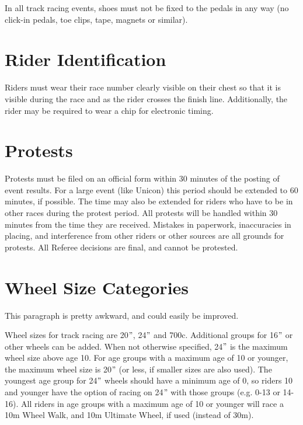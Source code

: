 In all track racing events, shoes must not be fixed to the pedals in any way (no click-in pedals, toe clips, tape, magnets or similar).%

\section{Rider Identification}

Riders must wear their race number clearly visible on their chest so that it is visible during the race and as the rider crosses the finish line.
Additionally, the rider may be required to wear a chip for electronic timing.

\section{Protests}

Protests must be filed on an official form within 30 minutes of the posting of event results.
For a large event (like Unicon) this period should be extended to 60 minutes, if possible.
The time may also be extended for riders who have to be in other races during the protest period.
All protests will be handled within 30 minutes from the time they are received.
Mistakes in paperwork, inaccuracies in placing, and interference from other riders or other sources are all grounds for protests.
All Referee decisions are final, and cannot be protested.

\section{Wheel Size Categories}

\begin{comment-2016}
This paragraph is pretty awkward, and could easily be improved.
\end{comment-2016}

Wheel sizes for track racing are 20$"$, 24$"$ and 700c.
Additional groups for 16$"$ or other wheels can be added.
When not otherwise specified, 24$"$ is the maximum wheel size above age 10.
For age groups with a maximum age of 10 or younger, the maximum wheel size is 20$"$ (or less, if smaller sizes are also used).
The youngest age group for 24$"$ wheels should have a minimum age of 0, so riders 10 and younger have the option of racing on 24$"$ with those groups (e.g. 0-13 or 14-16).
All riders in age groups with a maximum age of 10 or younger will race a 10m Wheel Walk, and 10m Ultimate Wheel, if used (instead of 30m).

